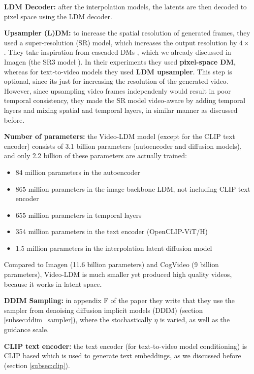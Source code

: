 \textbf{LDM Decoder: } after the interpolation models, the latents are then decoded to pixel space using the LDM decoder.

\textbf{Upsampler (L)DM: } to increase the spatial resolution of generated frames, they used a super-resolution (SR) model, which increases the output resolution by $4 \times $. They take inspiration from cascaded DMs \cite{cascaded_diffusion_models}, which we already discussed in Imagen (the SR3 model \cite{sr3}). In their experiments they used \textbf{pixel-space DM}, whereas for text-to-video models they used \textbf{LDM upsampler}. This step is optional, since its just for increasing the resolution of the generated video. However, since upsampling video frames independenly would result in poor temporal consistency, they made the SR model video-aware by adding temporal layers and mixing spatial and temporal layers, in similar manner as discussed before.

\textbf{Number of parameters: } the Video-LDM model (except for the CLIP text encoder) consists of 3.1 billion parameters (autoencoder and diffusion models), and only 2.2 billion of these parameters are actually trained:

\begin{itemize}
    \item 84 million parameters in the autoencoder
    \item 865 million parameters in the image backbone LDM, not including CLIP text encoder
    \item 655 million parameters in temporal layers
    \item 354 million parameters in the text encoder (OpenCLIP-ViT/H)
    \item 1.5 million parameters in the interpolation latent diffusion model
\end{itemize}

Compared to Imagen (11.6 billion parameters) and CogVideo (9 billion parameters), Video-LDM is much smaller yet produced high quality videos, because it works in latent space.

\textbf{DDIM Sampling:} in appendix F of the paper they write that they use the sampler from denoising diffusion implicit models (DDIM) \cite{ddim} (section \ref{subsec:ddim_sampler}), where the stochastically $\eta$ is varied, as well as the guidance scale.

\textbf{CLIP text encoder: } the text encoder (for text-to-video model conditioning) is CLIP \cite{openai_clip} based which is used to generate text embeddings, as we discussed before (section \ref{subsec:clip}).










